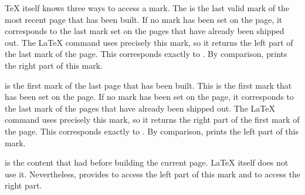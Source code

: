   \TeX{} itself knows three ways to access a mark. The %
   is the last valid mark of the
  most recent page that has been built. If no mark has been set on the page,
  it corresponds to the last mark set on the pages that have already been
  shipped out. The \LaTeX{} command  uses
  precisely this mark, so it returns the left part of the last mark of the
  page. This corresponds exactly to %
  . By comparison, %
   prints the right part of this mark.

  is the
  first mark of the last page that has been built. This is the first mark that
  has been set on the page. If no mark has been set on the page, it
  corresponds to the last mark of the pages that have already been shipped
  out. The \LaTeX{} command  uses precisely
  this mark, so it returns the right part of the first mark of the page. This
  corresponds exactly to %
  . By comparison, %
   prints the left part of this mark.

   is the content
  that  had before building the current page. \LaTeX{} itself
  does not use it. Nevertheless,  provides  to access the
  left part of this mark and %
   to access the right part.

